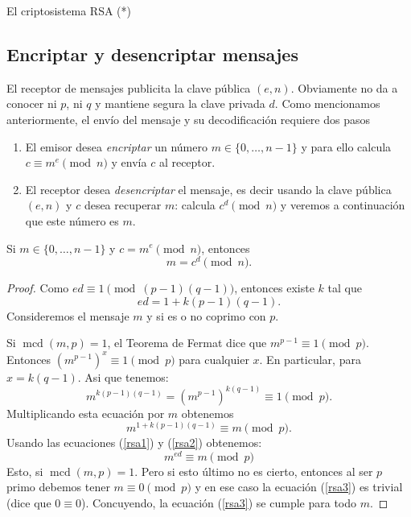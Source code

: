 \begin{section}{El criptosistema RSA (*)}
\begin{observacion*}
\end{observacion*}



\subsection*{Encriptar y desencriptar mensajes}

El receptor de mensajes publicita la clave pública $(e,n)$. Obviamente no da a conocer ni $p$, ni $q$ y mantiene segura la clave privada $d$. Como mencionamos anteriormente, el envío del mensaje y su decodificación requiere dos pasos
\begin{enumerate}[label=\textit{\alph*)}]
\item  El  emisor desea \emph{encriptar }un número $m \in \{0,\ldots,n-1\}$ y para ello calcula $c \equiv m^e \pmod{n}$ y  envía $c$ al receptor.
\item  El receptor desea \emph{desencriptar} el mensaje, es decir usando la clave pública $(e,n)$ y $c$ desea recuperar $m$: calcula $c^d \pmod{n}$ y veremos a continuación que este número es $m$. 
\end{enumerate}

\begin{proposicion} \label{rsa}Si $m \in \{0,\ldots,n-1\}$ y $c = m^e \pmod{n}$, entonces $$m= c^d \pmod{n}.$$
\end{proposicion} 
\begin{proof}
Como $ed \equiv 1 \pmod{(p - 1)(q - 1)}$, entonces existe $k$ tal que  
\begin{equation}\label{rsa1}
ed = 1 + k(p - 1)(q - 1).
\end{equation}
Consideremos el mensaje $m$ y si es o no coprimo con $p$.

Si $\operatorname{mcd}(m, p) = 1$, el Teorema de Fermat dice que $m^{p - 1}  \equiv 1\pmod{p}$.
Entonces $(m^{p - 1})^x \equiv 1\pmod{p}$ para cualquier $x$. En particular, para 
$x = k(q-1)$. Asi que tenemos:
\begin{equation*}
m^{k(p-1)(q-1)} = (m^{p-1})^{k(q-1)} \equiv 1\pmod{p}.
\end{equation*}
Multiplicando esta ecuación por $m$ obtenemos
\begin{equation}\label{rsa2}
m^{1+k(p-1)(q-1)} \equiv m\pmod{p}. 
\end{equation}
Usando las ecuaciones (\ref{rsa1}) y (\ref{rsa2}) obtenemos:
\begin{equation}\label{rsa3}
m^{ed} \equiv m\pmod{p} 
\end{equation}
Esto, si  $\operatorname{mcd}(m, p) = 1$. Pero si esto último no es cierto, entonces al ser $p$
primo debemos tener $m \equiv 0\pmod{p}$ y en ese caso la ecuación (\ref{rsa3}) es trivial (dice que $0 \equiv 0$). Concuyendo, la ecuación (\ref{rsa3}) se cumple para todo $m$.


\end{proof}
\end{section}
